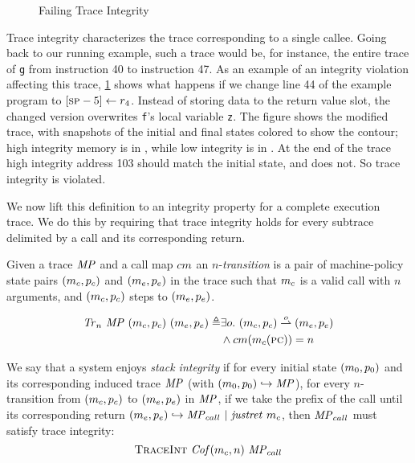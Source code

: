 \documentclass[acmsmall,review,anonymous]{acmart}\settopmatter{printfolios=true,printccs=false,printacmref=false}
\begin{document}
{\begin{figure}
  \integrityexample
  \caption{Failing Trace Integrity}
  \label{fig:intex}
\end{figure}

Trace integrity characterizes the trace corresponding to a single
callee.
Going back to our running example, such a trace would be, for
instance, the entire trace of {\tt g} from instruction 40 to
instruction 47.
As an example of an integrity violation affecting this trace, \cref{fig:intex} shows what happens
if we change line 44 of the example program to $[\textsc{sp} - 5] \leftarrow r_4$.
Instead of storing data to the return value slot,
the changed version overwrites {\tt f}'s local variable {\tt z}.
The figure shows the modified trace, with snapshots of the initial
and final states colored to show the contour; high
integrity memory is in \high, while low integrity is in \low.
At the end of the trace high integrity address 103 should match the initial
state, and does not. So trace integrity is violated.

We now lift this definition to an integrity property for a complete
execution trace. We do this by requiring that trace integrity holds
for every subtrace delimited by a call and its corresponding return.

 Given a trace \(\mathit{MP}\) and a call map \(cm\)
an \(n\)-{\em transition} is a pair of
machine-policy state pairs \((m_c,p_c)\) and
\((m_e,p_e)\) in the trace such that
\(m_c\) is a valid call with \(n\) arguments, and
\((m_c,p_c)\) steps to \((m_e,p_e)\).


  \[\begin{split}
    \mathit{Tr}_n ~ \mathit{MP} ~ (m_c,p_c) ~ (m_e,p_e)
    \triangleq & \exists o.
    ~ (m_c,p_c) \overset{o}{\rightharpoonup} (m_e,p_e) \\
    & \land cm(m_c(\textsc{pc})) = n
  \end{split}\]


We say that a system enjoys {\em stack integrity} if for every initial
state $(m_0,p_0)$ and its corresponding induced trace $\mathit{MP}$ (with
$(m_0,p_0) \hookrightarrow \mathit{MP}$), for every
$n$-transition from $(m_c,p_c)$ to
$(m_e,p_e)$ in $\mathit{MP}$, if we take the prefix of the
call until its corresponding return $(m_e,p_e)
\hookrightarrow \mathit{MP}_{call} ~ | ~ \mathit{justret}\ m_c$, then $\mathit{MP}_{call}$ must
satisfy trace integrity:
\[\text{\sc TraceInt} ~ \mathit{Cof}(m_c,n) ~ \mathit{MP}_{call}\]


}
\end{document}
